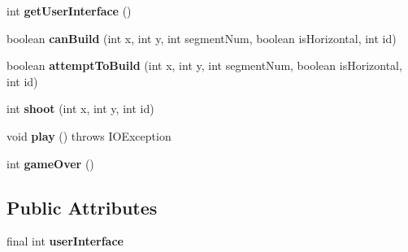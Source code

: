 \begin{DoxyCompactItemize}
\item 
int {\bfseries get\+User\+Interface} ()\hypertarget{classGame_a58893520607641213710ecf42d4984c0}{}\label{classGame_a58893520607641213710ecf42d4984c0}

\item 
boolean {\bfseries can\+Build} (int x, int y, int segment\+Num, boolean is\+Horizontal, int id)\hypertarget{classGame_af151f3c1db692f8dc482b5ad2351c723}{}\label{classGame_af151f3c1db692f8dc482b5ad2351c723}

\item 
boolean {\bfseries attempt\+To\+Build} (int x, int y, int segment\+Num, boolean is\+Horizontal, int id)\hypertarget{classGame_af2b475289d83fd193e7e648e0f98a69d}{}\label{classGame_af2b475289d83fd193e7e648e0f98a69d}

\item 
int {\bfseries shoot} (int x, int y, int id)\hypertarget{classGame_acdb27fef4ad28c9a9c07e7f095611f36}{}\label{classGame_acdb27fef4ad28c9a9c07e7f095611f36}

\item 
void {\bfseries play} ()  throws I\+O\+Exception \hypertarget{classGame_afeae4232ad3b23d07dcccc383e14ff08}{}\label{classGame_afeae4232ad3b23d07dcccc383e14ff08}

\item 
int {\bfseries game\+Over} ()\hypertarget{classGame_a81bd2e305d61946b102ed5094d2fa6c0}{}\label{classGame_a81bd2e305d61946b102ed5094d2fa6c0}

\end{DoxyCompactItemize}
\subsection*{Public Attributes}
\begin{DoxyCompactItemize}
\item 
final int {\bfseries user\+Interface}\hypertarget{classGame_a8ccbeac22c3c1dd4c9e25d958849a00b}{}\label{classGame_a8ccbeac22c3c1dd4c9e25d958849a00b}

\end{DoxyCompactItemize}
